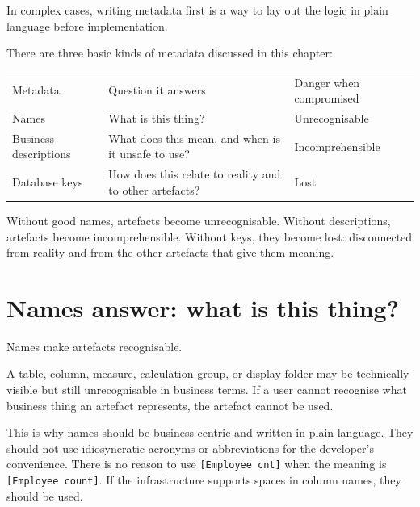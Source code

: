 \documentclass[10pt,openany,10pt]{book}
\newcounter{none}
\let\podeToprule\toprule
\let\podeMidrule\midrule
\let\podeBottomrule\bottomrule
\renewcommand{\toprule}{\arrayrulecolor{pbiGrid}\podeToprule}
\renewcommand{\midrule}{\arrayrulecolor{pbiGrid}\podeMidrule}
\renewcommand{\bottomrule}{\arrayrulecolor{pbiGrid}\podeBottomrule}
\begin{document}
In complex cases, writing metadata first is a way to lay out the logic
in plain language before implementation.

There are three basic kinds of metadata discussed in this chapter:

{\def\LTcaptype{none} %
\begin{longtable}[]{@{}
  >{\raggedright\arraybackslash}p{}
  >{\raggedright\arraybackslash}p{}
  >{\raggedright\arraybackslash}p{}@{}}
\toprule\noalign{}
\begin{minipage}[b]{\linewidth}\raggedright
Metadata
\end{minipage} & \begin{minipage}[b]{\linewidth}\raggedright
Question it answers
\end{minipage} & \begin{minipage}[b]{\linewidth}\raggedright
Danger when compromised
\end{minipage} \\
\midrule\noalign{}
\endhead
\bottomrule\noalign{}
\endlastfoot
Names & What is this thing? & Unrecognisable \\
Business descriptions & What does this mean, and when is it unsafe to
use? & Incomprehensible \\
Database keys & How does this relate to reality and to other artefacts?
& Lost \\
\end{longtable}
}

Without good names, artefacts become unrecognisable. Without
descriptions, artefacts become incomprehensible. Without keys, they
become lost: disconnected from reality and from the other artefacts that
give them meaning.

\section{Names answer: what is this
thing?}\label{names-answer-what-is-this-thing}

Names make artefacts recognisable.

A table, column, measure, calculation group, or display folder may be
technically visible but still unrecognisable in business terms. If a
user cannot recognise what business thing an artefact represents, the
artefact cannot be used.

This is why names should be business-centric and written in plain
language. They should not use idiosyncratic acronyms or abbreviations
for the developer's convenience. There is no reason to use
\texttt{{[}Employee\ cnt{]}} when the meaning is
\texttt{{[}Employee\ count{]}}. If the infrastructure supports spaces in
column names, they should be used.
\end{document}
